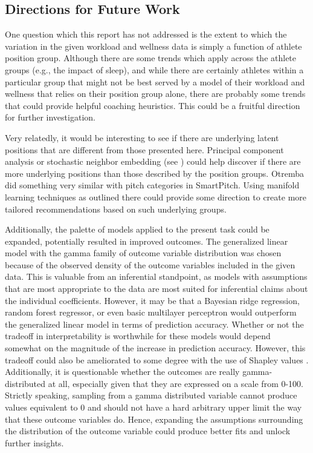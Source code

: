 \documentclass{article}
\begin{document}
		\subsection{Directions for Future Work}

			One question which this report has not addressed is the extent
			to which the variation in the given workload and wellness data is simply a
			function of athlete position group. Although there are some trends
			which apply across the athlete groups (e.g., the impact of sleep),
			and while there are certainly athletes within a particular group
			that might not be best served by a model of their
			workload and wellness that relies on their position group alone, there
			are probably some trends that could provide helpful coaching heuristics.
			This could be a fruitful direction for further investigation.

			Very relatedly, it would be interesting to see if there are
			underlying latent positions that are different from those presented
			here. Principal component analysis or stochastic neighbor
			embedding (see \cite{hinton2002stochastic}) could help discover if there
			are more underlying positions than those described by the position
			groups.
			Otremba \cite{otremba2022smartpitch} did something very similar
			with pitch categories in SmartPitch. Using manifold learning techniques
			as outlined there could provide some direction to create more tailored
			recommendations based on such underlying groups.

			Additionally, the palette of models applied to the present task could
			be expanded, potentially resulted in improved outcomes.
			The generalized linear model with the gamma family of outcome
			variable distribution was chosen because
			of the observed density of the outcome variables included in
			the given data. This is valuable
			from an inferential standpoint, as models with assumptions that are
			most appropriate to the data are most suited for inferential
			claims about the individual coefficients. However, it may be that
			a Bayesian ridge regression, random forest regressor, or even
			basic multilayer perceptron would outperform the generalized linear
			model in terms of prediction accuracy. Whether or not the tradeoff
			in interpretability is worthwhile for these models would depend
			somewhat on the magnitude of the increase in prediction accuracy.
			However, this tradeoff could also be ameliorated to some degree
			with the use of Shapley values \cite{vstrumbelj2014explaining}.
			Additionally, it is questionable whether the outcomes are really
			gamma-distributed at all, especially given that they are expressed
			on a scale from 0-100. Strictly speaking, sampling from a gamma
			distributed variable cannot produce values equivalent to 0 and
			should not have a hard arbitrary upper limit the way that these
			outcome variables do. Hence, expanding the assumptions surrounding
			the distribution of the outcome variable could produce better
			fits and unlock further insights.

	
	
\end{document}

